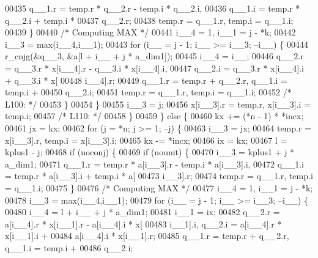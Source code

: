 \begin{DoxyCode}
00435                 q\_\_1.r = temp.r * q\_\_2.r - temp.i * q\_\_2.i, 
00436                     q\_\_1.i = temp.r * q\_\_2.i + temp.i * 
00437                     q\_\_2.r;
00438                 temp.r = q\_\_1.r, temp.i = q\_\_1.i;
00439             \}
00440 \textcolor{comment}{/* Computing MAX */}
00441             i\_\_4 = 1, i\_\_1 = j - *k;
00442             i\_\_3 = max(i\_\_4,i\_\_1);
00443             \textcolor{keywordflow}{for} (i\_\_ = j - 1; i\_\_ >= i\_\_3; --i\_\_) \{
00444                 r\_cnjg(&q\_\_3, &a[l + i\_\_ + j * a\_dim1]);
00445                 i\_\_4 = i\_\_;
00446                 q\_\_2.r = q\_\_3.r * x[i\_\_4].r - q\_\_3.i * x[i\_\_4].i, 
00447                     q\_\_2.i = q\_\_3.r * x[i\_\_4].i + q\_\_3.i * x[
00448                     i\_\_4].r;
00449                 q\_\_1.r = temp.r + q\_\_2.r, q\_\_1.i = temp.i + 
00450                     q\_\_2.i;
00451                 temp.r = q\_\_1.r, temp.i = q\_\_1.i;
00452 \textcolor{comment}{/* L100: */}
00453             \}
00454             \}
00455             i\_\_3 = j;
00456             x[i\_\_3].r = temp.r, x[i\_\_3].i = temp.i;
00457 \textcolor{comment}{/* L110: */}
00458         \}
00459         \} \textcolor{keywordflow}{else} \{
00460         kx += (*n - 1) * *incx;
00461         jx = kx;
00462         \textcolor{keywordflow}{for} (j = *n; j >= 1; --j) \{
00463             i\_\_3 = jx;
00464             temp.r = x[i\_\_3].r, temp.i = x[i\_\_3].i;
00465             kx -= *incx;
00466             ix = kx;
00467             l = kplus1 - j;
00468             \textcolor{keywordflow}{if} (noconj) \{
00469             \textcolor{keywordflow}{if} (nounit) \{
00470                 i\_\_3 = kplus1 + j * a\_dim1;
00471                 q\_\_1.r = temp.r * a[i\_\_3].r - temp.i * a[i\_\_3].i, 
00472                     q\_\_1.i = temp.r * a[i\_\_3].i + temp.i * a[
00473                     i\_\_3].r;
00474                 temp.r = q\_\_1.r, temp.i = q\_\_1.i;
00475             \}
00476 \textcolor{comment}{/* Computing MAX */}
00477             i\_\_4 = 1, i\_\_1 = j - *k;
00478             i\_\_3 = max(i\_\_4,i\_\_1);
00479             \textcolor{keywordflow}{for} (i\_\_ = j - 1; i\_\_ >= i\_\_3; --i\_\_) \{
00480                 i\_\_4 = l + i\_\_ + j * a\_dim1;
00481                 i\_\_1 = ix;
00482                 q\_\_2.r = a[i\_\_4].r * x[i\_\_1].r - a[i\_\_4].i * x[
00483                     i\_\_1].i, q\_\_2.i = a[i\_\_4].r * x[i\_\_1].i + 
00484                     a[i\_\_4].i * x[i\_\_1].r;
00485                 q\_\_1.r = temp.r + q\_\_2.r, q\_\_1.i = temp.i + 
00486                     q\_\_2.i;

\end{DoxyCode}
